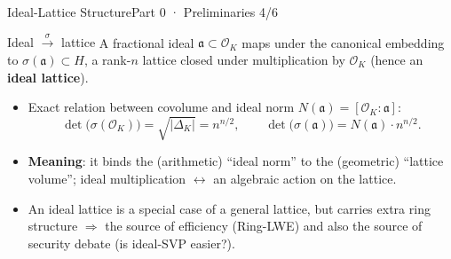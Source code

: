 \documentclass[aspectratio=169, 11pt]{beamer}
\newcommand{\OK}{\mathcal{O}_K}
\begin{document}
\begin{frame}{Ideal-Lattice Structure}{Part 0 · Preliminaries 4/6}
  \begin{block}{Ideal $\xrightarrow{\ \sigma\ }$ lattice}
    A fractional ideal $\mathfrak{a}\subset\OK$ maps under the canonical embedding to $\sigma(\mathfrak{a})\subset H$,
    a rank-$n$ lattice closed under multiplication by $\OK$ (hence an \textbf{ideal lattice}).
  \end{block}
  \begin{itemize}\small
    \item Exact relation between covolume and ideal norm $N(\mathfrak{a})=[\OK:\mathfrak{a}]$:
      \[
        \det\bigl(\sigma(\OK)\bigr)=\sqrt{|\Delta_K|}=n^{n/2},
        \qquad
        \det\bigl(\sigma(\mathfrak{a})\bigr)=N(\mathfrak{a})\cdot n^{n/2}.
      \]
    \item \textbf{Meaning}: it binds the (arithmetic) ``ideal norm'' to the (geometric) ``lattice volume'';
      ideal multiplication $\leftrightarrow$ an algebraic action on the lattice.
    \item An ideal lattice is a special case of a general lattice, but carries extra ring structure $\Rightarrow$
      \alert{the source of efficiency} (Ring-LWE) and also \alert{the source of security debate} (is ideal-SVP easier?).
  \end{itemize}
\end{frame}
\end{document}
